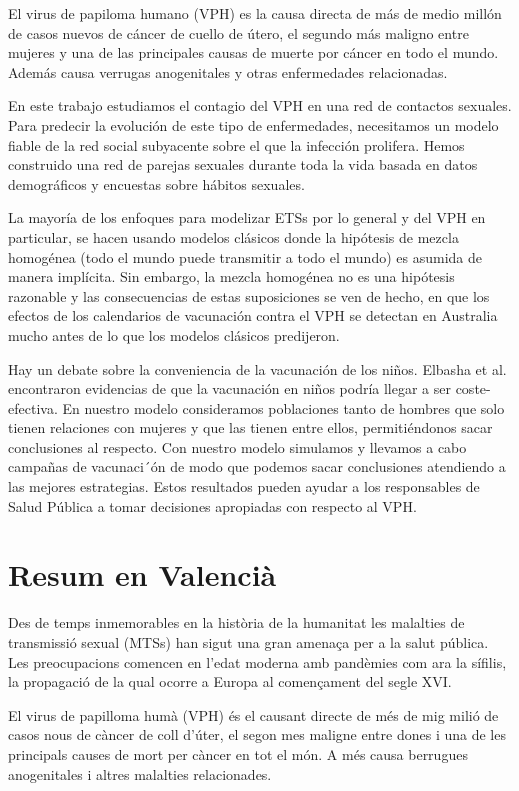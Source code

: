 El virus de papiloma humano (VPH) es la causa directa de m\'as de medio mill\'on de casos nuevos de c\'ancer de cuello de \'utero, el segundo m\'as maligno entre mujeres y una de las principales causas de muerte por c\'ancer en todo el mundo. Adem\'as causa verrugas anogenitales y otras enfermedades relacionadas.

En este trabajo estudiamos el contagio del VPH en una red de contactos sexuales. Para predecir la evoluci\'on de este tipo de enfermedades, necesitamos un modelo fiable de la red social subyacente sobre el que la infecci\'on prolifera. Hemos construido una red de parejas sexuales durante toda la vida basada en datos demogr\'aficos y encuestas sobre h\'abitos sexuales.

La mayor\'ia de los enfoques para modelizar ETSs por lo general y del VPH en particular, se hacen usando modelos cl\'asicos donde la hip\'otesis de mezcla homog\'enea (todo el mundo puede transmitir a todo el mundo) es asumida de manera impl\'icita. Sin embargo, la mezcla homog\'enea no es una hip\'otesis razonable y las consecuencias de estas suposiciones se ven de hecho, en que los efectos de los calendarios de vacunaci\'on contra el VPH se detectan en Australia mucho antes de lo que los modelos cl\'asicos predijeron.

Hay un debate sobre la conveniencia de la vacunaci\'on de los ni\~nos. Elbasha et al. encontraron evidencias de que la vacunaci\'on en ni\~nos podr\'ia llegar a ser coste-efectiva. En nuestro modelo consideramos poblaciones tanto de hombres que solo tienen relaciones con mujeres y que las tienen entre ellos, permiti\'endonos sacar conclusiones al respecto. Con nuestro modelo simulamos y llevamos a cabo campa\~nas de vacunaci´\'on de modo que podemos sacar conclusiones atendiendo a las mejores estrategias. Estos resultados pueden ayudar a los responsables de Salud P\'ublica a tomar decisiones apropiadas con respecto al VPH.

\chapter*{Resum en Valenci\`a}
Des de temps inmemorables en la hist\`oria de la humanitat les malalties de transmissi\'o sexual (MTSs) han sigut una gran amena\c{c}a per a la salut p\'ublica. Les preocupacions comencen en l'edat moderna amb pand\`emies com ara la s\'ifilis, la propagaci\'o de la qual ocorre a Europa al comen\c{c}ament del segle XVI. 

El virus de papilloma hum\`a (VPH) \'es el causant directe de m\'es de mig mili\'o de casos nous de c\`ancer de coll d'\'uter, el segon mes maligne entre dones i una de les principals causes de mort per c\`ancer en tot el m\'on. A m\'es causa berrugues anogenitales i altres malalties relacionades. 

